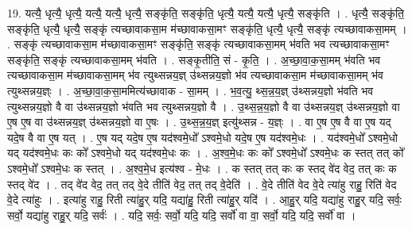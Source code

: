\documentclass[17pt]{extarticle}
\begin{document}
19. यत्यै॒ धृत्यै॒ धृत्यै॒ यत्यै॒ यत्यै॒ धृत्यै॒ सङ्कृ॑ति॒ सङ्कृ॑ति॒ धृत्यै॒ यत्यै॒ यत्यै॒ धृत्यै॒ सङ्कृ॑ति । . धृत्यै॒ सङ्कृ॑ति॒ सङ्कृ॑ति॒ धृत्यै॒ धृत्यै॒ सङ्कृ॑ त्यच्छावाकसा॒म म॑च्छावाकसा॒मꣳ सङ्कृ॑ति॒ धृत्यै॒ धृत्यै॒ सङ्कृ॑ त्यच्छावाकसा॒मम् । . सङ्कृ॑ त्यच्छावाकसा॒म म॑च्छावाकसा॒मꣳ सङ्कृ॑ति॒ सङ्कृ॑ त्यच्छावाकसा॒मम् भ॑वति भव
त्यच्छावाकसा॒मꣳ सङ्कृ॑ति॒ सङ्कृ॑ त्यच्छावाकसा॒मम् भ॑वति । . सङ्कृ॒तीति॒ सं - कृ॒ति॒ । . अ॒च्छा॒वा॒क॒सा॒मम् भ॑वति भव त्यच्छावाकसा॒म म॑च्छावाकसा॒मम् भ॑व त्युथ्सन्नय॒ज्ञ् उ॑थ्सन्नय॒ज्ञो भ॑व त्यच्छावाकसा॒म म॑च्छावाकसा॒मम् भ॑व त्युथ्सन्नय॒ज्ञ्ः । . अ॒च्छा॒वा॒क॒सा॒ममित्य॑च्छावाक - सा॒मम् । . भ॒व॒त्यु॒ थ्स॒न्न॒य॒ज्ञ् उ॑थ्सन्नय॒ज्ञो भ॑वति भव त्युथ्सन्नय॒ज्ञो वै वा उ॑थ्सन्नय॒ज्ञो भ॑वति भव
त्युथ्सन्नय॒ज्ञो वै । . उ॒थ्स॒न्न॒य॒ज्ञो वै वा उ॑थ्सन्नय॒ज्ञ् उ॑थ्सन्नय॒ज्ञो वा ए॒ष ए॒ष वा उ॑थ्सन्नय॒ज्ञ् उ॑थ्सन्नय॒ज्ञो वा ए॒षः । . उ॒थ्स॒न्न॒य॒ज्ञ् इत्यु॑थ्सन्न - य॒ज्ञ्ः । . वा ए॒ष ए॒ष वै वा ए॒ष यद् यदे॒ष वै वा ए॒ष यत् । . ए॒ष यद् यदे॒ष ए॒ष यद॑श्वमे॒धो᳚ ऽश्वमे॒धो यदे॒ष ए॒ष यद॑श्वमे॒धः । . यद॑श्वमे॒धो᳚ ऽश्वमे॒धो यद् यद॑श्वमे॒धः कः को᳚ ऽश्वमे॒धो यद् यद॑श्वमे॒धः कः । . अ॒श्व॒मे॒धः कः को᳚ ऽश्वमे॒धो᳚ ऽश्वमे॒धः क स्तत् तत् को᳚ ऽश्वमे॒धो᳚ ऽश्वमे॒धः क स्तत् । . अ॒श्व॒मे॒ध इत्य॑श्व - मे॒धः । . क स्तत् तत् कः क स्तद् वे॑द वेद॒ तत् कः क स्तद् वे॑द । . तद् वे॑द वेद॒ तत् तद् वे॒दे तीति॑ वेद॒ तत् तद् वे॒देति॑ । . वे॒दे तीति॑ वेद वे॒दे त्या॑हु राहु॒ रिति॑ वेद वे॒दे त्या॑हुः । . इत्या॑हु राहु॒ रिती त्या॑हु॒र् यदि॒ यद्या॑हु॒ रिती त्या॑हु॒र् यदि॑ । . आ॒हु॒र् यदि॒ यद्या॑हु राहु॒र् यदि॒ सर्वः॒ सर्वो॒ यद्या॑हु राहु॒र् यदि॒ सर्वः॑ । . यदि॒ सर्वः॒ सर्वो॒ यदि॒ यदि॒ सर्वो॑ वा वा॒ सर्वो॒ यदि॒ यदि॒ सर्वो॑ वा । \newline
\end{document}
